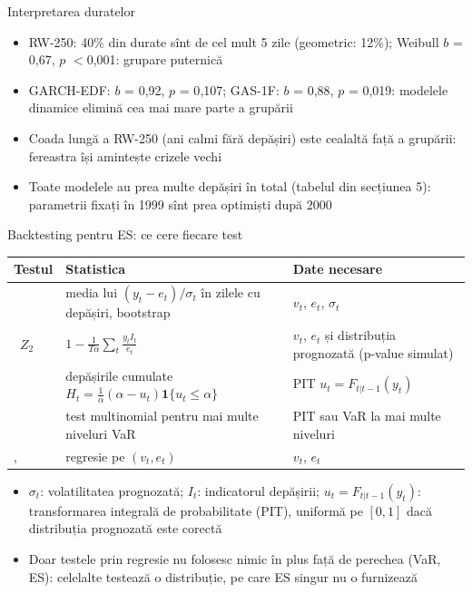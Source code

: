 \begin{frame}{Interpretarea duratelor}
\itemsize{\small}
\begin{itemize}
    \item RW-250: 40\% din durate sînt de cel mult 5 zile (geometric: 12\%); Weibull $b$ = 0{,}67, $p$ $<$0{,}001: grupare puternică
    \item GARCH-EDF: $b$ = 0{,}92, $p$ = 0{,}107; GAS-1F: $b$ = 0{,}88, $p$ = 0{,}019: modelele dinamice elimină cea mai mare parte a grupării
    \item Coada lungă a RW-250 (ani calmi fără depășiri) este cealaltă față a grupării: fereastra își amintește crizele vechi
    \item Toate modelele au prea multe depășiri în total (tabelul din secțiunea 5): parametrii fixați în 1999 sînt prea optimiști după 2000
\end{itemize}
\end{frame}

\begin{frame}{Backtesting pentru ES: ce cere fiecare test}
\itemsize{\footnotesize}
\begin{center}
\scriptsize
\begin{tabular}{>{\raggedright\arraybackslash}p{3.2cm}>{\raggedright\arraybackslash}p{4.5cm}>{\raggedright\arraybackslash}p{3.8cm}}
\toprule
\textbf{Testul} & \textbf{Statistica} & \textbf{Date necesare} \\
\midrule
{}{} & media lui $(y_t - e_t)/\sigma_t$ în zilele cu depășiri, bootstrap & $v_t$, $e_t$, $\sigma_t$ \\
\ $Z_2$ & $1 - \frac{1}{T\alpha}\sum_t \frac{y_tI_t}{e_t}$ & $v_t$, $e_t$ și distribuția prognozată (p-value simulat) \\
{} & depășirile cumulate $H_t = \frac{1}{\alpha}(\alpha - u_t)\mathbf 1\{u_t \le \alpha\}$ & PIT $u_t = F_{t|t-1}(y_t)$ \\
{} & test multinomial pentru mai multe niveluri VaR & PIT sau VaR la mai multe niveluri \\
, {} & regresie pe $(v_t, e_t)$ & $v_t$, $e_t$ \\
\bottomrule
\end{tabular}
\end{center}
\begin{itemize}
    \item $\sigma_t$: volatilitatea prognozată; $I_t$: indicatorul depășirii; $u_t = F_{t|t-1}(y_t)$: transformarea integrală de probabilitate (PIT), uniformă pe $[0, 1]$ dacă distribuția prognozată este corectă
    \item Doar testele prin regresie nu folosesc nimic în plus față de perechea (VaR, ES): celelalte testează o distribuție, pe care ES singur nu o furnizează
\end{itemize}
\end{frame}

